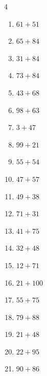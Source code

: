 \begin{multicols}{4}
\begin{enumerate}
\columnbreak %

  \item $61+51$
        \phantom{$=112$}

  \item $65+84$
        \phantom{$=149$}

  \item $31+84$
        \phantom{$=115$}

  \item $73+84$
        \phantom{$=157$}

  \item $43+68$
        \phantom{$=111$}

  \item $98+63$
        \phantom{$=161$}

  \item $3+47$
        \phantom{$=50$}

  \item $99+21$
        \phantom{$=120$}

  \item $55+54$
        \phantom{$=109$}

  \item $47+57$
        \phantom{$=104$}

  \item $49+38$
        \phantom{$=87$}

  \item $71+31$
        \phantom{$=102$}

  \item $41+75$
        \phantom{$=116$}

  \item $32+48$
        \phantom{$=80$}

  \item $12+71$
        \phantom{$=83$}

  \item $21+100$
        \phantom{$=121$}

  \item $55+75$
        \phantom{$=130$}

  \item $79+88$
        \phantom{$=167$}

  \item $21+48$
        \phantom{$=69$}

  \item $22+95$
        \phantom{$=117$}

  \item $90+86$
        \phantom{$=176$}


\end{enumerate}
\end{multicols}
